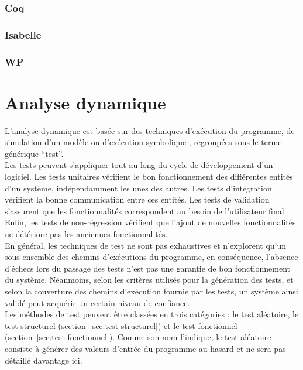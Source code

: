 \subsubsection{Coq}

\subsubsection{Isabelle}

\subsubsection{WP}



\section{Analyse dynamique}
\label{sec:AD}

L’analyse dynamique est basée sur des techniques d’exécution du programme, de
simulation \cite{simulation} d’un modèle ou d'exécution symbolique
\cite{symbolic-execution}, regroupées sous le terme générique ``test''.\\

Les tests peuvent s’appliquer tout au long du cycle de développement d’un
logiciel. Les tests unitaires vérifient le bon fonctionnement des différentes
entités d’un système, indépendamment les unes des autres. Les tests
d'intégration vérifient la bonne communication entre ces entités. Les tests de
validation s'assurent que les fonctionnalités correspondent au besoin de
l’utilisateur final. Enfin, les tests de non-régression vérifient que l'ajout de
nouvelles fonctionnalités ne détériore pas les anciennes fonctionnalités.\\

En général, les techniques de test ne sont pas exhaustives et n'explorent qu'un
sous-ensemble des chemins d'exécutions du programme, en conséquence, l’absence
d’échecs lors du passage des tests n’est pas une garantie de bon fonctionnement
du système. Néanmoins, selon les critères utilisés pour la génération des
tests, et selon la couverture des chemins d'exécution fournie par les tests, un
système ainsi validé peut acquérir un certain niveau de confiance.\\

Les méthodes de test peuvent être classées en trois catégories : le test
aléatoire, le test structurel (section~\ref{sec:test-structurel}) et le test
fonctionnel (section~\ref{sec:test-fonctionnel}). Comme son nom l'indique, le
test aléatoire consiste à générer des valeurs d'entrée du programme au hasard et
ne sera pas détaillé davantage ici.


